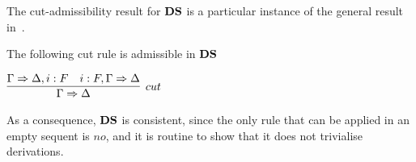 The cut-admissibility result for $\mathbf{DS}$ is a particular instance of the general result in~\cite{DBLP:journals/apal/MarinMPV22}.
\begin{theorem}\label{thm:cut}
The following cut rule is admissible in $\mathbf{DS}$

\vspace{0.15cm}
\qquad\qquad\qquad\qquad$
\infer[cut]{\Gamma\seq\Delta}{\Gamma\seq\Delta,i: F  & i: F ,\Gamma\seq\Delta}
$
\end{theorem}
As a consequence, %
$\mathbf{DS}$ is consistent, since the only rule that can be applied in an empty sequent is $no$, and it is routine to show that it does not trivialise derivations. 




